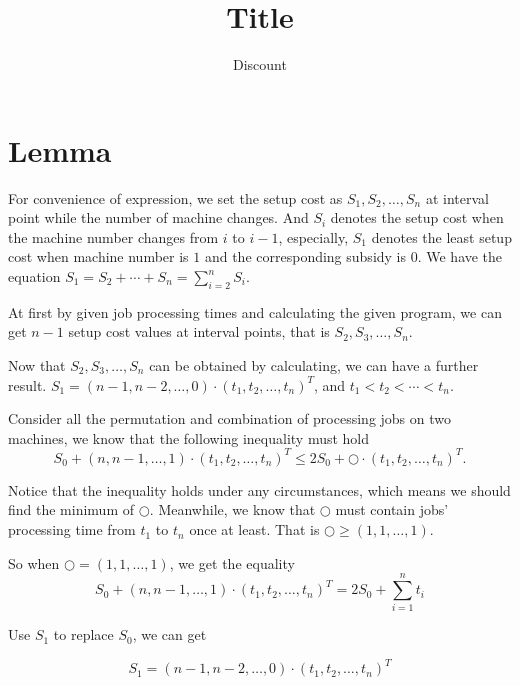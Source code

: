 \documentclass[UTF8]{article}
\title{Title}
\author{Discount}
\date{}
\begin{document}
\maketitle{}

\section{Lemma}

\quad For convenience of expression, we set the setup cost as $S_{1},S_{2}, \dots ,S_{n}$ at interval point while the number of machine changes.
And $S_{i}$ denotes the setup cost when the machine number changes from $i$ to $i-1$, especially, $S_{1}$ denotes the least setup cost when machine number is $1$ and the corresponding subsidy is $0$.
We have the equation $S_{1}=S_{2}+\cdots+S_{n}=\sum_{i=2}^n S_i$.

At first by given job processing times and calculating the given program, we can get $n-1$ setup cost values at interval points, that is $S_2,S_3,\dots,S_n$.

Now that $S_2,S_3,\dots,S_n$ can be obtained by calculating, we can have a further result. $S_{1}=(n-1,n-2,\dots,0) \cdot (t_1,t_2,\dots,t_n)^T $, and $ t_1<t_2<\cdots<t_n$.

Consider all the permutation and combination of processing jobs on two machines, we know that the following inequality must hold
\begin{equation*}
S_0+(n,n-1,\dots,1)\cdot(t_1,t_2,\dots,t_n)^T \leq
2S_0+ \bigcirc \cdot (t_1,t_2,\dots,t_n)^T.
\end{equation*}



Notice that the inequality holds under any circumstances, which means we should find the minimum of $\bigcirc$.  Meanwhile, we know that $\bigcirc$ must contain jobs' processing time from $t_1$ to $t_n$ once at least. That is $\bigcirc \geq (1,1,\dots,1)$.

So when $\bigcirc = (1,1,\dots,1)$, we get the equality
\begin{equation}
    S_0+(n,n-1,\dots,1) \cdot (t_1,t_2,\dots,t_n)^T= 2S_0+\sum_{i=1}^n t_i
\end{equation}

\qquad  Use $S_1$ to replace $S_0$, we can get

\begin{equation}
  S_{1}=(n-1,n-2,\dots,0) \cdot (t_1,t_2,\dots,t_n)^T
\end{equation}
\end{document}
